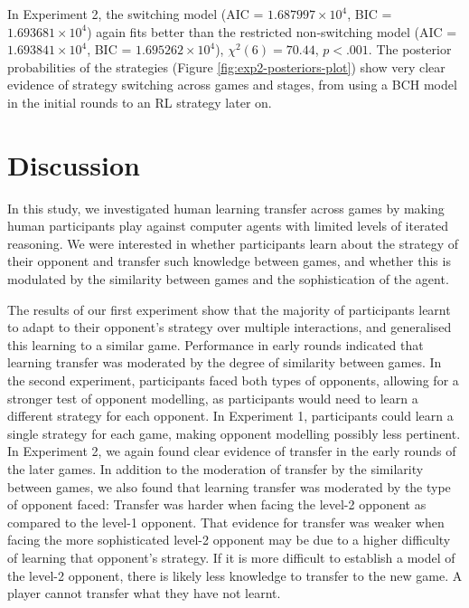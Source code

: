 \documentclass[smallextended]{svjour3}       %
\begin{document}
In Experiment 2, the switching model (AIC =
\ensuremath{1.687997\times 10^{4}}, BIC =
\ensuremath{1.693681\times 10^{4}}) again fits better than the
restricted non-switching model (AIC =
\ensuremath{1.693841\times 10^{4}}, BIC =
\ensuremath{1.695262\times 10^{4}}), \(\chi^2(6) = 70.44\),
\(p < .001\). The posterior probabilities of the strategies (Figure
\ref{fig:exp2-posteriors-plot}) show very clear evidence of strategy
switching across games and stages, from using a BCH model in the initial
rounds to an RL strategy later on.

\hypertarget{discussion-2}{%
\section{Discussion}\label{discussion-2}}

In this study, we investigated human learning transfer across games by
making human participants play against computer agents with limited
levels of iterated reasoning. We were interested in whether participants
learn about the strategy of their opponent and transfer such knowledge
between games, and whether this is modulated by the similarity between
games and the sophistication of the agent.

The results of our first experiment show that the majority of
participants learnt to adapt to their opponent's strategy over multiple
interactions, and generalised this learning to a similar game.
Performance in early rounds indicated that learning transfer was
moderated by the degree of similarity between games. In the second
experiment, participants faced both types of opponents, allowing for a
stronger test of opponent modelling, as participants would need to learn
a different strategy for each opponent. In Experiment 1, participants
could learn a single strategy for each game, making opponent modelling
possibly less pertinent. In Experiment 2, we again found clear evidence
of transfer in the early rounds of the later games. In addition to the
moderation of transfer by the similarity between games, we also found
that learning transfer was moderated by the type of opponent faced:
Transfer was harder when facing the level-2 opponent as compared to the
level-1 opponent. That evidence for transfer was weaker when facing the
more sophisticated level-2 opponent may be due to a higher difficulty of
learning that opponent's strategy. If it is more difficult to establish
a model of the level-2 opponent, there is likely less knowledge to
transfer to the new game. A player cannot transfer what they have not
learnt.
\end{document}
